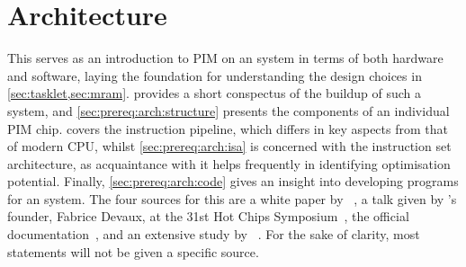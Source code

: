 \section{Architecture}
\label{sec:prereq:arch}

This  serves as an introduction to \ac{PIM} on an \upmem{} system in terms of both hardware and software, laying the foundation for understanding the design choices in \cref{sec:tasklet,sec:mram}.
 provides a short conspectus of the buildup of such a system, and \cref{sec:prereq:arch:structure} presents the components of an individual \ac{PIM} chip.
 covers the instruction pipeline, which differs in key aspects from that of modern \ac{CPU}, whilst \cref{sec:prereq:arch:isa} is concerned with the instruction set architecture, as acquaintance with it helps frequently in identifying optimisation potential.
Finally, \cref{sec:prereq:arch:code} gives an insight into developing programs for an \upmem{} system.
The four sources for this  are a white paper by \upmem{}~\cite{upmem2021WhitePaper}, a talk given by \upmem{}'s founder, Fabrice Devaux, at the 31st Hot Chips Symposium~\cite{upmem2019HotChips}, the official documentation~\cite{upmemSDK}, and an extensive study by \citeauthor{mutlu2022Benchmarking}~\cite{mutlu2022Benchmarking}.
For the sake of clarity, most statements will not be given a specific source.











